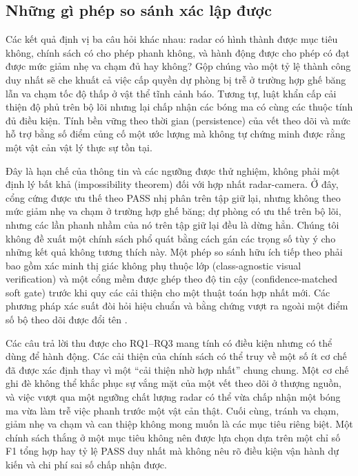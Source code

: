 \documentclass[conference]{IEEEtran}
\begin{document}
\subsection{Những gì phép so sánh xác lập được}
Các kết quả định vị ba câu hỏi khác nhau: radar có hình thành được mục tiêu
không, chính sách có cho phép phanh không, và hành động được cho phép có đạt
được mức giảm nhẹ va chạm đủ hay không? Gộp chúng vào một tỷ lệ thành công duy
nhất sẽ che khuất cả việc cấp quyền dự phòng bị trễ ở trường hợp ghế băng lẫn va chạm tốc
độ thấp ở vật thể tĩnh cảnh báo. Tương tự, luật khẩn cấp cải thiện độ phủ trên
bộ lõi nhưng lại chấp nhận các bóng ma có cùng các thuộc tính đủ điều kiện.
Tính bền vững theo thời gian (persistence) của vết theo dõi và mức hỗ trợ bằng
số điểm củng cố một ước lượng mà không tự chứng minh được rằng một vật cản vật
lý thực sự tồn tại.

Đây là hạn chế của thông tin và các ngưỡng được thử nghiệm, không phải một định
lý bất khả (impossibility theorem) đối với hợp nhất radar-camera. Ở đây, cổng
cứng được ưu thế theo PASS nhị phân trên tập giữ lại, nhưng không theo mức giảm
nhẹ va chạm ở trường hợp ghế băng; dự phòng có ưu thế trên bộ lõi, nhưng các
lần phanh nhầm của nó trên tập giữ lại đều là dừng hẳn. Chúng tôi không đề
xuất một chính sách phổ quát bằng cách gán các trọng số tùy ý cho những kết
quả không tương thích này. Một phép so sánh hữu ích tiếp theo phải bao gồm xác
minh thị giác không phụ thuộc lớp (class-agnostic visual verification) và một
cổng mềm được ghép theo độ tin cậy (confidence-matched soft gate) trước khi
quy các cải thiện cho một thuật toán hợp nhất mới. Các phương pháp xác suất
đòi hỏi hiệu chuẩn và bằng chứng vượt ra ngoài một điểm số bộ theo dõi được
đổi tên \cite{sandblom2011threat,lindenmaier2022existence}.

Các câu trả lời thu được cho RQ1--RQ3 mang tính có điều kiện nhưng có thể dùng
để hành động. Các cải thiện của chính sách có thể truy về một số ít cơ chế đã
được xác định thay vì một ``cải thiện nhờ hợp nhất'' chung chung. Một cơ chế
ghi đè không thể khắc phục sự vắng mặt của một vết theo dõi ở thượng nguồn, và
việc vượt qua một ngưỡng chất lượng radar có thể vừa chấp nhận một bóng ma vừa
làm trễ việc phanh trước một vật cản thật. Cuối cùng, tránh va chạm, giảm nhẹ
va chạm và can thiệp không mong muốn là các mục tiêu riêng biệt. Một chính
sách thắng ở một mục tiêu không nên được lựa chọn dựa trên một chỉ số F1 tổng
hợp hay tỷ lệ PASS duy nhất mà không nêu rõ điều kiện vận hành dự kiến và chi
phí sai số chấp nhận được.
\end{document}
